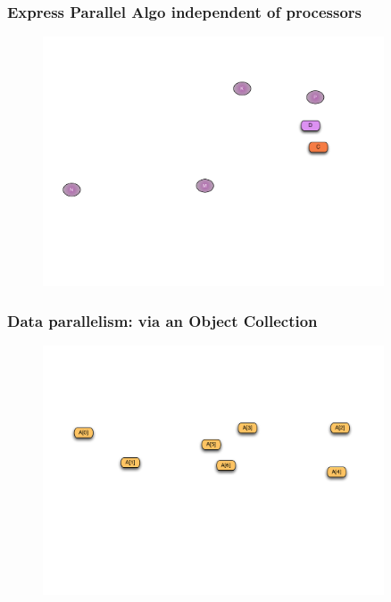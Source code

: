 \begin{frame}
  \frametitle{Express Parallel Algo independent of processors}
  \begin{figure}\includegraphics[width=0.9\textwidth]{../figures/progmodel/01-objects-for-algo.pdf}\end{figure}
\end{frame}


\begin{frame}
  \frametitle{Data parallelism: via an Object Collection}
  \begin{figure}\includegraphics[width=0.9\textwidth]{../figures/progmodel/02-data-decomp-via-arrays.pdf}\end{figure}
\end{frame}



